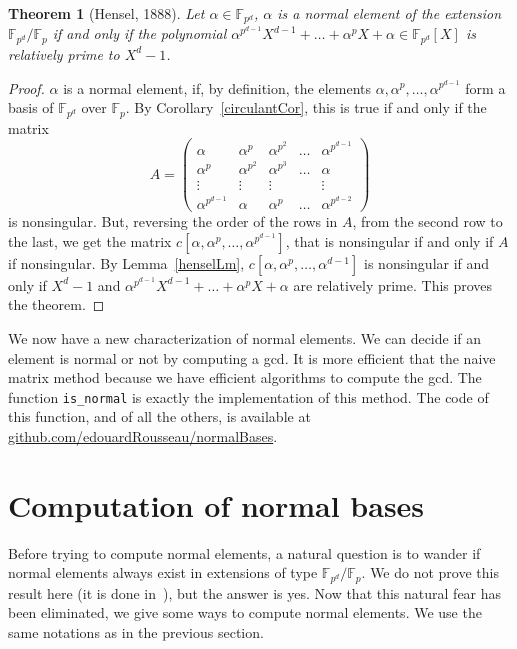 \documentclass[a4paper,11pt]{article}
\theoremstyle{break}
\newtheorem{thm}{Theorem}[section]
\theoremstyle{sc}
\theoremstyle{definition}
\theoremstyle{remark}
\begin{document}
\begin{thm}[Hensel, 1888]
  \label{hensel}
  Let $\alpha\in\mathbb{F}_{p^d}$, $\alpha$ is a normal element of the
  extension $\mathbb{F}_{p^d}/\mathbb{F}_p$ if and only if the polynomial
  $\alpha^{p^{d-1}}X^{d-1}+\dots+\alpha^pX+\alpha\in\mathbb{F}_{p^d}[X]$ 
  is relatively prime to $X^d-1$.
\end{thm}
\begin{proof}
  $\alpha$ is a normal element, if, by definition, the elements $\alpha,
  \alpha^p, \dots, \alpha^{p^{d-1}}$ form a basis of
  $\mathbb{F}_{p^d}$ over $\mathbb{F}_p$. By
  Corollary~\ref{circulantCor}, this is
  true if and only if the matrix
  \[
    A =
    \begin{pmatrix}
      \alpha & \alpha^p & \alpha^{p^2} & \dots & \alpha^{p^{d-1}} \\
      \alpha^p & \alpha^{p^2} & \alpha^{p^3} & \dots & \alpha \\
      \vdots & \vdots & \vdots & & \vdots \\
      \alpha^{p^{d-1}} & \alpha & \alpha^p & \dots & \alpha^{p^{d-2}}
    \end{pmatrix}
  \]
  is nonsingular. But, reversing the order of the rows in $A$, from the second
  row to the last, we get the matrix $c[\alpha, \alpha^p, \dots,
  \alpha^{p^{d-1}}]$, that is nonsingular if and only if $A$ if
  nonsingular. By Lemma~\ref{henselLm}, $c[\alpha, \alpha^p, \dots,
  \alpha^{d-1}]$ is nonsingular if and only if $X^d-1$ and
  $\alpha^{p^{d-1}}X^{d-1}+\dots+\alpha^pX+\alpha$ are relatively prime.
  This proves the theorem.
\end{proof}
We now have a new characterization of normal elements. We can decide if an
element is normal or not by computing a gcd. It is more efficient that the
naive matrix method because we have efficient algorithms to compute the gcd.
The function \texttt{is\_normal} is exactly the implementation of this
method. The code of this function, and of all the others, is available at
\url{github.com/edouardRousseau/normalBases}.

\section{Computation of normal bases}
Before trying to compute normal elements, a natural question is to wander if
normal elements always exist in extensions of type
$\mathbb{F}_{p^{d}}/\mathbb{F}_p$. We do not prove this result here (it is done
in~\cite{Ga93}), but the answer is yes. Now that this natural fear has been
eliminated, we give some ways to compute normal elements. We use the same
notations as in the previous section.
\end{document}
